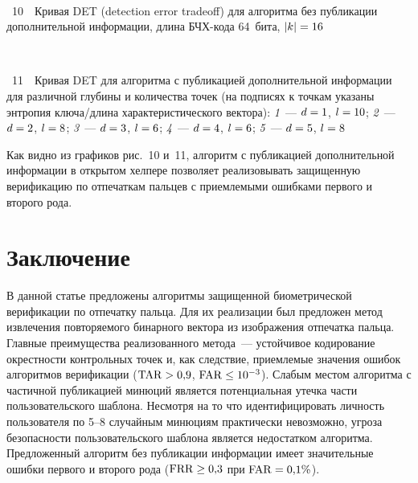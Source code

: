 \begin{multicols}{2}
\columnbreak
      

\noindent
\begin{center} %
\vspace*{1pt}
\mbox{%
  \epsfxsize=72.074mm
}
\end{center}

\vspace*{1pt}
\noindent
{{\figurename~10}\ \ \small{Кривая DET (detection error tradeoff) для алгоритма без публикации дополнительной информации,
длина БЧХ-кода 64~бита, $\vert k\vert \hm= 16$}}

\vspace*{6pt}

\begin{center} %
\vspace*{1pt}
\mbox{%
  \epsfxsize=73.158mm
}
\end{center}

\vspace*{1pt}
\noindent
{{\figurename~11}\ \ \small{Кривая DET для алгоритма с публикацией дополнительной информации для различной 
глубины и количества точек (на подписях к точкам указаны энтропия ключа/длина 
характеристического вектора): \textit{1}~--- $d\hm=1$, $l\hm=10$;
\textit{2}~--- $d\hm=2$, $l\hm=8$;
\textit{3}~--- $d\hm=3$, $l\hm=6$;
\textit{4}~--- $d\hm=4$, $l\hm=6$;
\textit{5}~--- $d\hm=5$, $l\hm=8$}}

\vspace*{9pt}


Как видно из графиков рис.~10 и~11, 
алгоритм с пуб\-ли\-ка\-ци\-ей дополнительной информации
 в открытом хелпере позволяет 
реализовывать защищенную верификацию по отпечаткам пальцев с приемлемыми 
ошибками первого и второго рода. 


\section{Заключение}
      В данной статье предложены алгоритмы защищенной биометрической 
верификации по отпечатку пальца. Для их реализации был предложен метод извлечения 
повторяемого бинарного вектора из изображения отпечатка пальца. Главные 
преимущества реализованного метода~--- устойчивое кодирование окрестности 
контрольных точек и, как следствие, приемлемые значения ошибок алгоритмов 
верификации ($\mathrm{TAR}\hm > 0{,}9$, $\mathrm{FAR}\hm\leq 10^{-3}$). Слабым местом алгоритма с 
частичной публикацией минюций является потенциальная утечка час\-ти 
пользовательского шаблона. Несмотря на то что идентифицировать личность 
пользователя по 5--8 случайным минюциям практически не\-воз\-можно, угроза 
безопасности пользовательского шаблона является недостатком алгоритма. 
Предложенный алгоритм без публикации информации \mbox{имеет} значительные ошибки 
первого и второго рода ($\mathrm{FRR}\hm\geq 0{,}3$ при $\mathrm{FAR}\hm =0{,}1\%$).
      

\end{multicols}
